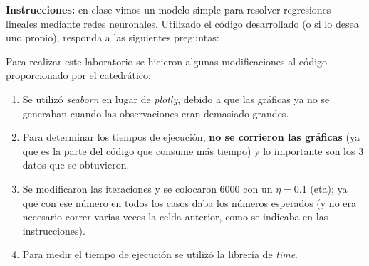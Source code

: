 





\textbf{Instrucciones:} en clase vimos un modelo simple para resolver regresiones lineales mediante redes neuronales.  Utilizado el código desarrollado (o si lo desea uno propio), responda a las siguientes preguntas:

\begin{cajita}
	Para realizar este laboratorio se hicieron algunas modificaciones al código proporcionado por el catedrático: 
	\begin{enumerate}
		\item Se utilizó \textit{seaborn} en lugar de \textit{plotly}, debido a que las gráficas ya no se generaban cuando las observaciones eran demasiado grandes. 
		\item Para determinar los tiempos de ejecución, \textbf{no se corrieron las gráficas} (ya que es la parte del código que consume más tiempo) y lo importante son los 3 datos que se obtuvieron. 
		\item Se modificaron las iteraciones y se colocaron 6000 con un $\eta= $0.1 (eta); ya que con ese número en todos los casos daba los números esperados (y no era necesario correr varias veces la celda anterior, como se indicaba en las instrucciones).
		\item Para medir el tiempo de ejecución se utilizó la librería de \textit{time}.  
	\end{enumerate}
\end{cajita}


